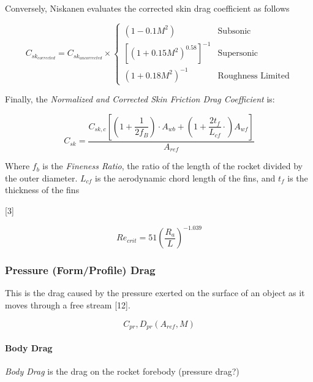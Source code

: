 \documentclass[]{article}
\let\oldparagraph\paragraph
\renewcommand{\paragraph}[1]{\oldparagraph{#1}\mbox{}}
\begin{document}
Conversely, Niskanen evaluates the corrected skin drag coefficient as
follows

\begin{equation}
\label{eq_skin_drag_coefficient_corrected}
C_{sk_{corrected}} = C_{sk_{uncorrected}} \times 
\begin{cases}
     ( 1- 0.1 M^2 )                          & \text{Subsonic} \\
     \left[ (1+0.15 M^2)^{0.58} \right]^{-1} & \text{Supersonic} \\
     ( 1 + 0.18 M^2 )^{-1}                   & \text{Roughness Limited}
\end{cases}
\end{equation}

Finally, the \emph{Normalized and Corrected Skin Friction Drag
Coefficient} is:

\begin{equation}
C_{sk} = \dfrac{ C_{sk,c} \left[ \left( 1+ \dfrac{1}{2 f_B} \right) \cdot A_{wb} + \left( 1 + \dfrac{2t_f}{L_{cf}}\cdot \right) A_{wf} \right] }{A_{ref}}
\end{equation}

Where \(f_b\) is the \emph{Fineness Ratio}, the ratio of the length of
the rocket divided by the outer diameter. \(L_{cf}\) is the aerodynamic
chord length of the fins, and \(t_f\) is the thickness of the fins

{[}3{]}

\begin{equation}
\label{eq_reynolds_critical}
Re_{crit} = 51 \left( \dfrac{R_a}{L} \right) ^{-1.039} 
\end{equation}

\subsubsection{Pressure (Form/Profile)
Drag}\label{pressure-formprofile-drag}

This is the drag caused by the pressure exerted on the surface of an
object as it moves through a free stream {[}12{]}.

\begin{equation} 
C_{pr}, D_{pr} (A_{ref}, M) 
\end{equation}

\paragraph{Body Drag}\label{body-drag}

\emph{Body Drag} is the drag on the rocket forebody (pressure drag?)
\end{document}
